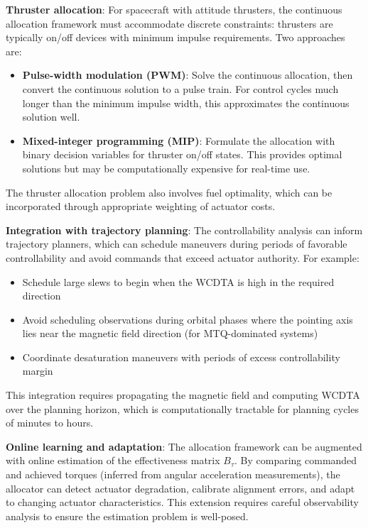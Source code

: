 \documentclass[conference]{IEEEtran}
\begin{document}
\textbf{Thruster allocation}: For spacecraft with attitude thrusters, the continuous allocation framework must accommodate discrete constraints: thrusters are typically on/off devices with minimum impulse requirements. Two approaches are:
\begin{itemize}
    \item \textbf{Pulse-width modulation (PWM)}: Solve the continuous allocation, then convert the continuous solution to a pulse train. For control cycles much longer than the minimum impulse width, this approximates the continuous solution well.
    \item \textbf{Mixed-integer programming (MIP)}: Formulate the allocation with binary decision variables for thruster on/off states. This provides optimal solutions but may be computationally expensive for real-time use.
\end{itemize}
The thruster allocation problem also involves fuel optimality, which can be incorporated through appropriate weighting of actuator costs.

\textbf{Integration with trajectory planning}: The controllability analysis can inform trajectory planners, which can schedule maneuvers during periods of favorable controllability and avoid commands that exceed actuator authority. For example:
\begin{itemize}
    \item Schedule large slews to begin when the WCDTA is high in the required direction
    \item Avoid scheduling observations during orbital phases where the pointing axis lies near the magnetic field direction (for MTQ-dominated systems)
    \item Coordinate desaturation maneuvers with periods of excess controllability margin
\end{itemize}
This integration requires propagating the magnetic field and computing WCDTA over the planning horizon, which is computationally tractable for planning cycles of minutes to hours.

\textbf{Online learning and adaptation}: The allocation framework can be augmented with online estimation of the effectiveness matrix $B_\tau$. By comparing commanded and achieved torques (inferred from angular acceleration measurements), the allocator can detect actuator degradation, calibrate alignment errors, and adapt to changing actuator characteristics. This extension requires careful observability analysis to ensure the estimation problem is well-posed.
\end{document}
